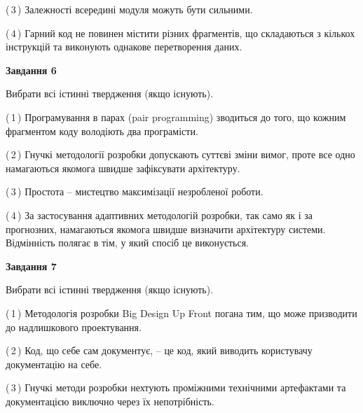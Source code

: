 \documentclass[10pt, ukrainian]{article}
\begin{document}
{\begin {large}
(\,3\,) Залежності всередині модуля можуть бути сильними. %



(\,4\,) Гарний код не повинен містити різних фрагментів, що складаються з кількох інструкцій та виконують однакове перетворення даних. %

\newpage

{\begin {center}\textbf{Завдання 6}\end {center}}\par
Вибрати всі істинні твердження (якщо існують).\par
\vspace{2mm}



(\,1\,) Програмування в парах (pair programming) зводиться до того, що кожним фрагментом коду володіють два програмісти. %



(\,2\,) Гнучкі методології розробки допускають суттєві зміни вимог, проте все одно намагаються якомога швидше зафіксувати архітектуру. %



(\,3\,) Простота – мистецтво максимізації незробленої роботи. %



(\,4\,) За застосування адаптивних методологій розробки, так само як і за прогнозних, намагаються якомога швидше визначити архітектуру системи. Відмінність полягає в тім, у який спосіб це виконується.%


{\begin {center}\textbf{Завдання 7}\end {center}}\par
Вибрати всі істинні твердження (якщо існують).\par
\vspace{2mm}



(\,1\,) Методологія розробки Big Design Up Front погана тим, що може призводити до надлишкового проектування. %



(\,2\,) Код, що себе сам документує, -- це код, який виводить користувачу документацію на себе. %



(\,3\,) Гнучкі методи розробки нехтують проміжними технічними артефактами та документацією виключно через їх непотрібність. %




\end{large}}
\end{document}
